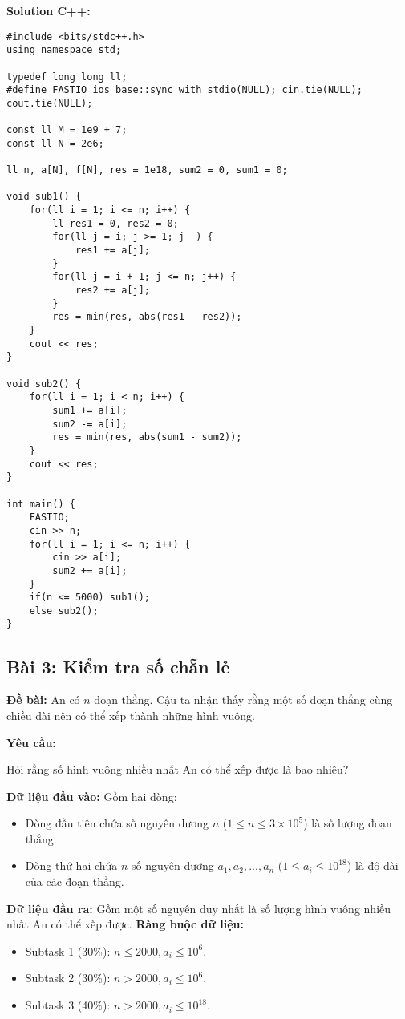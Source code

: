 \documentclass[12pt]{scrartcl}  %
\begin{document}
\textbf{Solution C++:}
\begin{lstlisting}
#include <bits/stdc++.h>
using namespace std;

typedef long long ll;
#define FASTIO ios_base::sync_with_stdio(NULL); cin.tie(NULL); cout.tie(NULL);

const ll M = 1e9 + 7;
const ll N = 2e6;

ll n, a[N], f[N], res = 1e18, sum2 = 0, sum1 = 0;

void sub1() {
    for(ll i = 1; i <= n; i++) {
        ll res1 = 0, res2 = 0;
        for(ll j = i; j >= 1; j--) {
            res1 += a[j];
        }
        for(ll j = i + 1; j <= n; j++) {
            res2 += a[j];
        }
        res = min(res, abs(res1 - res2));
    }
    cout << res;
}

void sub2() {
    for(ll i = 1; i < n; i++) {
        sum1 += a[i];
        sum2 -= a[i];
        res = min(res, abs(sum1 - sum2));
    }
    cout << res;
}

int main() {
    FASTIO;
    cin >> n;
    for(ll i = 1; i <= n; i++) {
        cin >> a[i];
        sum2 += a[i];
    }
    if(n <= 5000) sub1();
    else sub2();
}
\end{lstlisting}

\subsection{Bài 3: Kiểm tra số chẵn lẻ}
\textbf{Đề bài:}
An có $n$ đoạn thẳng. Cậu ta nhận thấy rằng một số đoạn thẳng cùng chiều dài nên có thể xếp thành những hình vuông.

\textbf{Yêu cầu:}

Hỏi rằng số hình vuông nhiều nhất An có thể xếp được là bao nhiêu?

\textbf{Dữ liệu đầu vào:}
Gồm hai dòng:
\begin{itemize}
    \item Dòng đầu tiên chứa số nguyên dương $n$ ($1 \leq n \leq 3 \times 10^5$) là số lượng đoạn thẳng.
    \item Dòng thứ hai chứa $n$ số nguyên dương $a_1, a_2, ..., a_n$ ($1 \leq a_i \leq 10^{18}$) là độ dài của các đoạn thẳng.
\end{itemize}
\textbf{Dữ liệu đầu ra:}
Gồm một số nguyên duy nhất là số lượng hình vuông nhiều nhất An có thể xếp được.
\textbf{Ràng buộc dữ liệu:}

\begin{itemize}
    \item Subtask 1 (30\%): $n \leq 2000, a_i \leq 10^6$.
    \item Subtask 2 (30\%): $n > 2000, a_i \leq 10^6$.
    \item Subtask 3 (40\%): $n > 2000, a_i \leq 10^{18}$.
\end{itemize}
\end{document}
